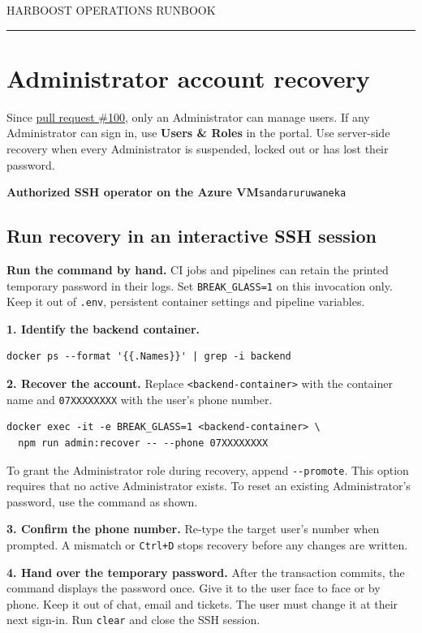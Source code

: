 \documentclass[11pt,a4paper]{article}
\begin{document}
{\small\color{graytext} HARBOOST \hfill OPERATIONS RUNBOOK}\par
{\color{lightborder}\hrule}
\section*{Administrator account recovery}
Since \href{https://github.com/Codtrek/tea-collection-management-system/pull/100}{pull request \#100}, only an Administrator can manage users. If any Administrator can sign in, use \textbf{Users \& Roles} in the portal. Use server-side recovery when every Administrator is suspended, locked out or has lost their password.

\textbf{Authorized SSH operator on the Azure VM}\quad \texttt{sandaruruwaneka}

\subsection*{Run recovery in an interactive SSH session}
\textcolor{amber}{\textbf{Run the command by hand.}} CI jobs and pipelines can retain the printed temporary password in their logs. Set \verb|BREAK_GLASS=1| on this invocation only. Keep it out of \texttt{.env}, persistent container settings and pipeline variables.

\textbf{1. Identify the backend container.}
\begin{lstlisting}
docker ps --format '{{.Names}}' | grep -i backend
\end{lstlisting}

\textbf{2. Recover the account.} Replace \verb|<backend-container>| with the container name and \verb|07XXXXXXXX| with the user's phone number.
\begin{lstlisting}
docker exec -it -e BREAK_GLASS=1 <backend-container> \
  npm run admin:recover -- --phone 07XXXXXXXX
\end{lstlisting}
To grant the Administrator role during recovery, append \verb|--promote|. This option requires that no active Administrator exists. To reset an existing Administrator's password, use the command as shown.

\textbf{3. Confirm the phone number.} Re-type the target user's number when prompted. A mismatch or \texttt{Ctrl+D} stops recovery before any changes are written.

\textbf{4. Hand over the temporary password.} After the transaction commits, the command displays the password once. Give it to the user face to face or by phone. Keep it out of chat, email and tickets. The user must change it at their next sign-in. Run \texttt{clear} and close the SSH session.
\end{document}
